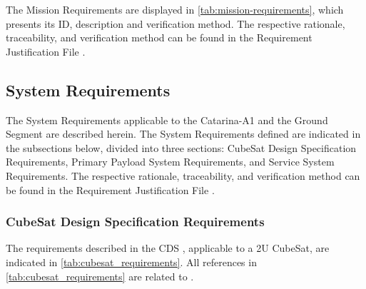 The Mission Requirements are displayed in \autoref{tab:mission-requirements}, which presents its \ac{ID}, description and verification method. The respective rationale, traceability, and verification method can be found in the Requirement Justification File \cite{RJF_A1}.

\subsection{System Requirements}

The System Requirements applicable to the Catarina-A1 and the Ground Segment are described herein. The System Requirements defined are indicated in the subsections below, divided into three sections: CubeSat Design Specification Requirements, Primary Payload System Requirements, and Service System Requirements. The respective rationale, traceability, and verification method can be found in the Requirement Justification File \cite{RJF_A1}.

\subsubsection{CubeSat Design Specification Requirements} \label{sec:cubesat_requirements}

The requirements described in the \ac{CDS} \cite{cds}, applicable to a 2U CubeSat, are indicated in \autoref{tab:cubesat_requirements}. All references in \autoref{tab:cubesat_requirements} are related to \cite{cds}.

